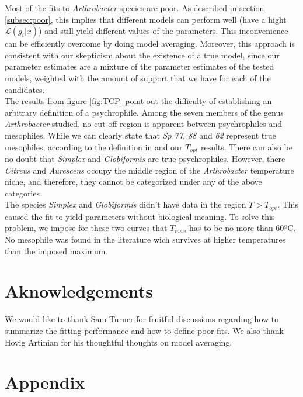 \documentclass[titlepage,11pt]{article}
\begin{document}
\begin{linenumbers}
			Most of the fits to \textit{Arthrobacter} species are poor. As described in section \ref{subsec:poor}, this implies that different models can perform well (have a hight $ \mathcal{L}(g_i|x) $) and still yield different values of the parameters. This inconvenience can be efficiently overcome by doing model averaging. Moreover, this approach is consistent with our skepticism about the existence of a true model, since our parameter estimates are a mixture of the parameter estimates of the tested models, weighted with the amount of support that we have for each of the candidates. \\
			The results from figure \ref{fig:TCP} point out the difficulty of establishing an arbitrary definition of a psychrophile. Among the seven members of the genus \textit{Arthrobacter} studied, no cut off region is apparent between psychrophiles and mesophiles. While we can clearly state that \textit{Sp 77, 88} and \textit{62} represent true mesophiles, according to the definition in \cite{INGRAHAM1958} and our $ T_{opt} $ results. There can also be no doubt that \textit{Simplex} and \textit{Globiformis} are true psychrophiles. However, there \textit{Citreus} and \textit{Aurescens} occupy the middle region of the \textit{Arthrobacter} temperature niche, and therefore, they cannot be categorized under any of the above categories. \\
			The species \textit{Simplex} and \textit{Globiformis} didn't have data in the region $ T > T_{opt} $. This caused the fit to yield parameters without biological meaning. To solve this problem, we impose for these two curves that $ T_{max} $ has to be no more than 60ºC. No mesophile was found in the literature \cite{Schiraldi2014} wich survives at higher temperatures than the imposed maximum. \\
			\section{Aknowledgements}
			We would like to thank Sam Turner for fruitful discussions regarding how to summarize the fitting performance and how to define poor fits. We also thank Hovig Artinian for his thoughtful thoughts on model averaging. 
			\newpage
			\section{Appendix}

\end{linenumbers}
\end{document}
